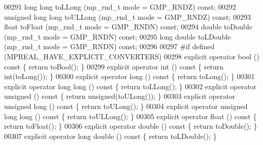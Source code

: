 \begin{DoxyCode}
00291     \textcolor{keywordtype}{long} \textcolor{keywordtype}{long}          toLLong     (mp\_rnd\_t mode = GMP\_RNDZ)    \textcolor{keyword}{const};
00292     \textcolor{keywordtype}{unsigned} \textcolor{keywordtype}{long} \textcolor{keywordtype}{long} toULLong    (mp\_rnd\_t mode = GMP\_RNDZ)    \textcolor{keyword}{const};
00293     \textcolor{keywordtype}{float}              toFloat     (mp\_rnd\_t mode = GMP\_RNDN)    \textcolor{keyword}{const};
00294     \textcolor{keywordtype}{double}             toDouble    (mp\_rnd\_t mode = GMP\_RNDN)    \textcolor{keyword}{const};
00295     \textcolor{keywordtype}{long} \textcolor{keywordtype}{double}        toLDouble   (mp\_rnd\_t mode = GMP\_RNDN)    \textcolor{keyword}{const};
00296 
00297 \textcolor{preprocessor}{#if defined (MPREAL\_HAVE\_EXPLICIT\_CONVERTERS)}
00298     \textcolor{keyword}{explicit} \textcolor{keyword}{operator} bool               ()\textcolor{keyword}{ const }\{ \textcolor{keywordflow}{return} toBool();                 \}
00299     \textcolor{keyword}{explicit} \textcolor{keyword}{operator} int                ()\textcolor{keyword}{ const }\{ \textcolor{keywordflow}{return} int(toLong());            \}
00300     \textcolor{keyword}{explicit} \textcolor{keyword}{operator} long               ()\textcolor{keyword}{ const }\{ \textcolor{keywordflow}{return} toLong();                 \}
00301     \textcolor{keyword}{explicit} \textcolor{keyword}{operator} \textcolor{keywordtype}{long} long          ()\textcolor{keyword}{ const }\{ \textcolor{keywordflow}{return} toLLong();                \}
00302     \textcolor{keyword}{explicit} \textcolor{keyword}{operator} unsigned           ()\textcolor{keyword}{ const }\{ \textcolor{keywordflow}{return} unsigned(toULong());      \}
00303     \textcolor{keyword}{explicit} \textcolor{keyword}{operator} \textcolor{keywordtype}{unsigned} long      ()\textcolor{keyword}{ const }\{ \textcolor{keywordflow}{return} toULong();                \}
00304     \textcolor{keyword}{explicit} \textcolor{keyword}{operator} \textcolor{keywordtype}{unsigned} \textcolor{keywordtype}{long} long ()\textcolor{keyword}{ const }\{ \textcolor{keywordflow}{return} toULLong();               \}
00305     \textcolor{keyword}{explicit} \textcolor{keyword}{operator} float              ()\textcolor{keyword}{ const }\{ \textcolor{keywordflow}{return} toFloat();                \}
00306     \textcolor{keyword}{explicit} \textcolor{keyword}{operator} double             ()\textcolor{keyword}{ const }\{ \textcolor{keywordflow}{return} toDouble();               \}
00307     \textcolor{keyword}{explicit} \textcolor{keyword}{operator} \textcolor{keywordtype}{long} double        ()\textcolor{keyword}{ const }\{ \textcolor{keywordflow}{return} toLDouble();              \}

\end{DoxyCode}
